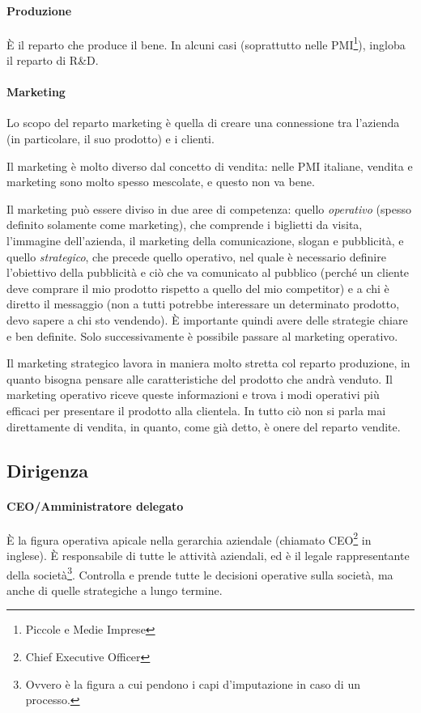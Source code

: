 \paragraph*{Produzione} È il reparto che produce il bene. In alcuni casi
(soprattutto nelle PMI\footnote{Piccole e Medie Imprese}), ingloba il
reparto di R\&D.

\paragraph*{Marketing}
\begin{definition}[Marketing]
Lo scopo del reparto marketing è quella di creare una connessione tra l'azienda
(in particolare, il suo prodotto) e i clienti.
\end{definition}

\noindent Il marketing è molto diverso dal concetto di vendita: nelle PMI
italiane, vendita e marketing sono molto spesso mescolate, e questo non va bene.

Il marketing può essere diviso in due aree di competenza: quello
\textit{operativo} (spesso definito solamente come marketing), che comprende i
biglietti da visita, l'immagine dell'azienda, il marketing della comunicazione,
slogan e pubblicità, e quello \textit{strategico}, che precede quello
operativo, nel quale è necessario definire l'obiettivo della pubblicità e ciò
che va comunicato al pubblico (perché un cliente deve comprare il mio prodotto
rispetto a quello del mio competitor) e a chi è diretto il messaggio (non a
tutti potrebbe interessare un determinato prodotto, devo sapere a chi sto
vendendo). È importante quindi avere delle strategie chiare e ben definite.
Solo successivamente è possibile passare al marketing operativo.

Il marketing strategico lavora in maniera molto stretta col reparto produzione,
in quanto bisogna pensare alle caratteristiche del prodotto che andrà venduto.
Il marketing operativo riceve queste informazioni e trova i modi operativi più
efficaci per presentare il prodotto alla clientela. In tutto ciò non si parla
mai direttamente di vendita, in quanto, come già detto, è onere del reparto
vendite.

\subsection{Dirigenza}

\paragraph*{CEO/Amministratore delegato} È la figura operativa apicale nella
gerarchia aziendale (chiamato CEO\footnote{Chief Executive Officer} in
inglese). È responsabile di tutte le attività aziendali, ed è il legale
rappresentante della società\footnote{Ovvero è la figura a cui pendono i capi
d'imputazione in caso di un processo.}. Controlla e prende tutte le decisioni
operative sulla società, ma anche di quelle strategiche a lungo termine.

